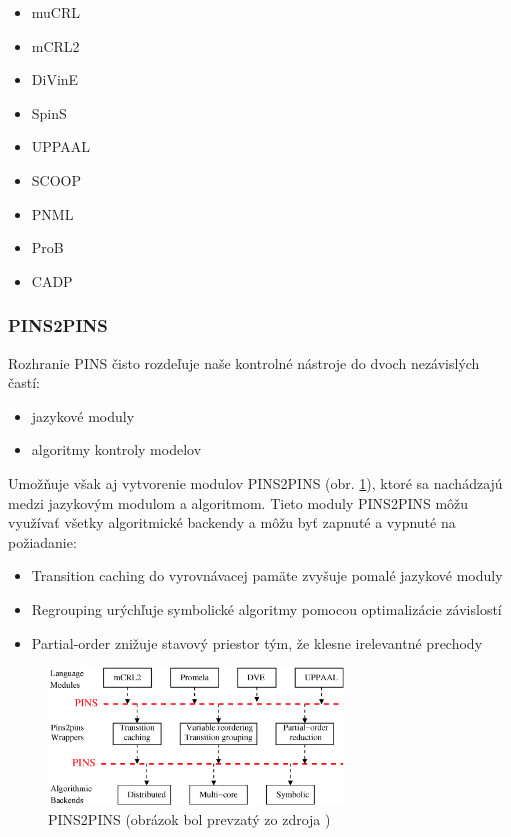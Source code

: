 \begin{itemize}
	\item muCRL
	\item mCRL2
	\item DiVinE
	\item SpinS
	\item UPPAAL
	\item SCOOP
	\item PNML
	\item ProB
	\item CADP
\end{itemize}

\subsubsection{PINS2PINS}
Rozhranie PINS čisto rozdeľuje naše kontrolné nástroje do dvoch nezávislých častí: 
\begin{itemize}
	\item jazykové moduly
	\item algoritmy kontroly modelov
\end{itemize}
Umožňuje však aj vytvorenie modulov PINS2PINS (obr. \ref{obr:pins2pins}), 
ktoré sa nachádzajú medzi jazykovým modulom a algoritmom.
Tieto moduly PINS2PINS môžu využívať všetky algoritmické backendy a 
môžu byť zapnuté a vypnuté na požiadanie:

\begin{itemize}
	\item Transition caching do vyrovnávacej pamäte zvyšuje pomalé jazykové moduly
	\item Regrouping urýchľuje symbolické algoritmy pomocou optimalizácie závislostí
	\item Partial-order znižuje stavový priestor tým, že klesne irelevantné prechody
\end{itemize}

\begin{figure}[H]
\centerline{\includegraphics[width=0.7\textwidth]{images/pins2pins}}
\caption[PINS2PINS (obrázok bol prevzatý zo zdroja \cite{br5})]{PINS2PINS (obrázok bol prevzatý zo zdroja \cite{br5})}
\label{obr:pins2pins}
\end{figure}